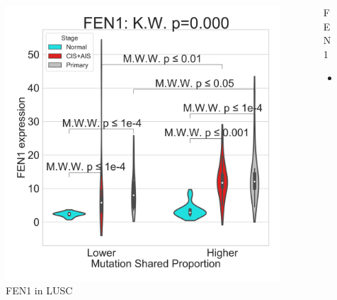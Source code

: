 \documentclass{beamer}
\begin{document}
\begin{frame}[allowframebreaks]
                    \begin{columns}
                        \begin{column}{0.4 \textwidth}
                            \begin{figure}
                                \includegraphics[width=\linewidth]{figures/DEG/Violin/STAR.TPM.SQC.MSP-Median.violin/Mutation Shared Proportion_FEN1.pdf}
                                \caption{FEN1 in LUSC}
                            \end{figure}
                        \end{column}
                        \begin{column}{0.55 \textwidth}
                            \begin{block}{FEN1}
                                \begin{itemize}
                                    \item
                                \end{itemize}
                            \end{block}
                        \end{column}
                    \end{columns}


\end{frame}
\end{document}
